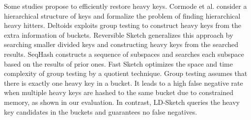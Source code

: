 Some studies propose to efficiently restore heavy keys.
Cormode et al.  \cite{Cormode2003} consider a hierarchical structure of keys
and formalize the problem of finding hierarchical heavy hitters.
Deltoids \cite{Cormode2004} exploits group testing to construct heavy keys
from the extra information of buckets.  Reversible Sketch \cite{Schweller2007}
generalizes this approach by searching smaller divided keys and constructing
heavy keys from the searched results.  SeqHash \cite{Bu2010} constructs a
sequence of subspaces and searches each subspace based on the results of prior
ones.  Fast Sketch \cite{Liu2012} optimizes the space and time complexity of
group testing by a quotient technique.
Group testing assumes that there is exactly one heavy key in a bucket.
It leads to a high false negative rate when multiple heavy keys are hashed to
the same bucket due to constrained memory, as shown in our evaluation.  In
contrast, LD-Sketch queries
the heavy key candidates in the buckets and guarantees no false negatives.


